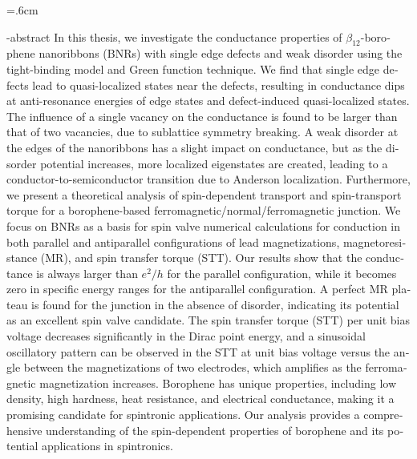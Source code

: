 
\baselineskip=.6cm
\begin{latin}
 

\en-abstract{
In this thesis, we investigate the conductance properties of $\beta_{12}$-borophene nanoribbons (BNRs) with single edge defects and weak disorder using the tight-binding model and Green function technique. We find that single edge defects lead to quasi-localized states near the defects, resulting in conductance dips at anti-resonance energies of edge states and defect-induced quasi-localized states. The influence of a single vacancy on the conductance is found to be larger than that of two vacancies, due to sublattice symmetry breaking. A weak disorder at the edges of the nanoribbons has a slight impact on conductance, but as the disorder potential increases, more localized eigenstates are created, leading to a conductor-to-semiconductor transition due to Anderson localization. Furthermore, we present a theoretical analysis of spin-dependent transport and spin-transport torque for a borophene-based ferromagnetic/normal/ferromagnetic junction. We focus on BNRs as a basis for spin valve numerical calculations for conduction in both parallel and antiparallel configurations of lead magnetizations, magnetoresistance (MR), and spin transfer torque (STT). Our results show that the conductance is always larger than $e^2/h$ for the parallel configuration, while it becomes zero in specific energy ranges for the antiparallel configuration. A perfect MR plateau is found for the junction in the absence of disorder, indicating its potential as an excellent spin valve candidate. The spin transfer torque (STT) per unit bias voltage decreases significantly in the Dirac point energy, and a sinusoidal oscillatory pattern can be observed in the STT at unit bias voltage versus the angle between the magnetizations of two electrodes, which amplifies as the ferromagnetic magnetization increases. Borophene has unique properties, including low density, high hardness, heat resistance, and electrical conductance, making it a promising candidate for spintronic applications. Our analysis provides a comprehensive understanding of the spin-dependent properties of borophene and its potential applications in spintronics.
}
\latinfirstPage
\end{latin}
